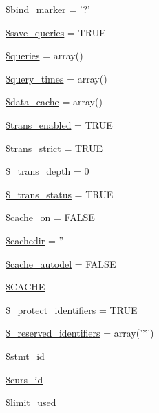 \begin{DoxyCompactItemize}
\item 
\hyperlink{class_c_i___d_b__driver_a253af4ebf23051f23690926079f4285d}{\$bind\-\_\-marker} = '?'
\item 
\hyperlink{class_c_i___d_b__driver_a083a278ea2075824db1db85edaa8e0a8}{\$save\-\_\-queries} = T\-R\-U\-E
\item 
\hyperlink{class_c_i___d_b__driver_a576b05de2f452e4cce4e3de12667ba0f}{\$queries} = array()
\item 
\hyperlink{class_c_i___d_b__driver_a060b2893433dfc037803cf6541420f5f}{\$query\-\_\-times} = array()
\item 
\hyperlink{class_c_i___d_b__driver_aab3007e30adbaf71d06218aa6c90e384}{\$data\-\_\-cache} = array()
\item 
\hyperlink{class_c_i___d_b__driver_a450683d6d87929985766484b2f6a9e7b}{\$trans\-\_\-enabled} = T\-R\-U\-E
\item 
\hyperlink{class_c_i___d_b__driver_ae3111155f1f3ec59fe667b90dafb179f}{\$trans\-\_\-strict} = T\-R\-U\-E
\item 
\hyperlink{class_c_i___d_b__driver_a0724b7f82d62f35ef5e150146ed2a27b}{\$\-\_\-trans\-\_\-depth} = 0
\item 
\hyperlink{class_c_i___d_b__driver_a93acf0189d34131e156c6eb4a48c2b5b}{\$\-\_\-trans\-\_\-status} = T\-R\-U\-E
\item 
\hyperlink{class_c_i___d_b__driver_ab29a8930111a4f2a57987a9031982c34}{\$cache\-\_\-on} = F\-A\-L\-S\-E
\item 
\hyperlink{class_c_i___d_b__driver_a01f61437be9e9a04ee228f5d455265db}{\$cachedir} = ''
\item 
\hyperlink{class_c_i___d_b__driver_a3da421c22206e24614dc73c9536ff605}{\$cache\-\_\-autodel} = F\-A\-L\-S\-E
\item 
\hyperlink{class_c_i___d_b__driver_a54f3ab89da1323e5680116d8e9e94b83}{\$\-C\-A\-C\-H\-E}
\item 
\hyperlink{class_c_i___d_b__driver_a2e8a156a3c2abda43a4f160bcb5252e9}{\$\-\_\-protect\-\_\-identifiers} = T\-R\-U\-E
\item 
\hyperlink{class_c_i___d_b__driver_aa3298c4c62fbee8bb09f1b75b633fb0d}{\$\-\_\-reserved\-\_\-identifiers} = array('$\ast$')
\item 
\hyperlink{class_c_i___d_b__driver_a1a97f17fd259cd27c73b65e6c3706ec0}{\$stmt\-\_\-id}
\item 
\hyperlink{class_c_i___d_b__driver_a75e7d18ad2e68ace3813533c9da2e179}{\$curs\-\_\-id}
\item 
\hyperlink{class_c_i___d_b__driver_a96df35d7e3e76bef21ebb80234fe59e8}{\$limit\-\_\-used}
\end{DoxyCompactItemize}
